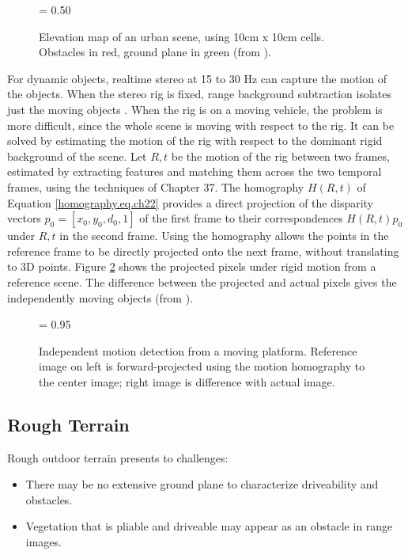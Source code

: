 \documentclass[twocolumn,oneside]{book}
\begin{document}
\begin{figure}[hbt]
{\epsfxsize = 0.50\textwidth {}}
\caption{Elevation map of an urban scene, using 10cm x 10cm cells.
Obstacles in red, ground plane in green (from \cite{triebel06}).
\label{elev_map.ch22}}
\end{figure}

For dynamic objects, realtime stereo at 15 to 30 Hz can capture the
motion of the objects.  When the stereo rig is fixed, range background
subtraction isolates just the moving objects \cite{eveland98}.  When
the rig is on a moving vehicle, the problem is more difficult, since
the whole scene is moving with respect to the rig.  It can be solved
by estimating the motion of the rig with respect to the dominant rigid
background of the scene.  Let $R,t$ be the motion of the rig between
two frames, estimated by extracting features and matching them across
the two temporal frames, using the techniques of Chapter 37.
The homography $H(R,t)$ of Equation
\ref{homography.eq.ch22} provides a direct projection of the disparity
vectors $p_0 = [x_0,y_0,d_0,1]$ of the first frame to their
correspondences $H(R,t)p_0$ under $R,t$ in the second frame.  Using
the homography allows the points in the reference frame to be directly
projected onto the next frame, without translating to 3D points.
Figure \ref{ind_motion.ch22} shows the projected pixels under rigid
motion from a reference scene.  The difference between the projected
and actual pixels gives the independently moving objects (from
\cite{agrawal05}).

\begin{figure}[ht!]
{\epsfxsize = 0.95\textwidth {}}
\caption{Independent motion detection from a moving platform.
Reference image on left is forward-projected using the motion homography to
the center image; right image is difference with actual image.
\label{ind_motion.ch22}}
\end{figure}


\subsection{Rough Terrain} \label{ch22.roughterrain}

Rough outdoor terrain presents to challenges:
\begin{itemize}
\item There may be no extensive ground plane to characterize
driveability and obstacles.
\item Vegetation that is pliable and driveable may appear as an
obstacle in range images.
\end{itemize}
\end{document}
